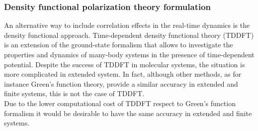 \subsubsection{Density functional polarization theory formulation}\label{ss:dfpt}
An alternative way to include correlation effects in the real-time dynamics is the density functional approach. Time-dependent density functional theory (TDDFT) is an extension of the ground-state formalism that allows to investigate the properties and dynamics of many-body systems in the presence of time-dependent potential.\cite{PhysRevLett.52.997} 
Despite the success of TDDFT in molecular systems, the situation is more complicated in extended system.
In fact, although other methods, as for instance Green's function theory\cite{strinati}, provide a similar accuracy in extended\cite{Aulbur19991} and finite systems\cite{faber2012electron}, this is not the case of TDDFT.\\
Due to the lower computational cost of TDDFT respect to Green's function formalism it would be desirable to have the same accuracy in extended and finite systems.\\
